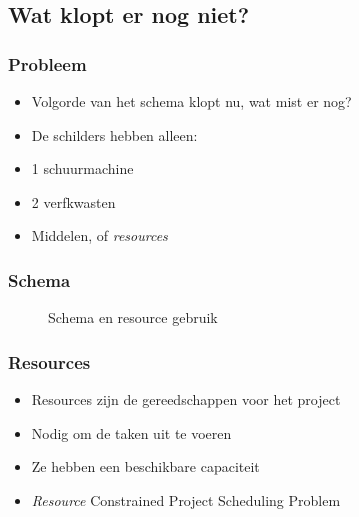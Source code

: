 \documentclass{beamer}
\theoremstyle{definition}
\newcommand{\inputtikz}[1]{}
\begin{document}
\subsection{Wat klopt er nog niet?}
\begin{frame}
	\frametitle{Probleem}
	\begin{itemize}
		\item Volgorde van het schema klopt nu, wat mist er nog?
		\item<2->  De schilders hebben alleen:
		\item<2-> 1 schuurmachine
		\item<2-> 2 verfkwasten
		\item<3-> Middelen, of \emph{resources}
	\end{itemize}
\end{frame}

\begin{frame}
\frametitle{Schema}
	\vspace{-1.2em}
	\begin{figure}[ht]
		\makebox[\textwidth][c]{\resizebox{.36\paperwidth}{!}{
			\inputtikz{schedule_infeasible_colored_profile}
		}}
		\vspace{-1.3em}
		\caption{Schema en resource gebruik}
	\end{figure}
\end{frame}

\begin{frame}
	\frametitle{Resources}
	\begin{itemize}
		\item Resources zijn de gereedschappen voor het project
		\item Nodig om de taken uit te voeren
		\item Ze hebben een beschikbare capaciteit
		\item \emph{Resource} Constrained Project Scheduling Problem
	\end{itemize}
\end{frame}
\end{document}
